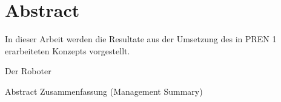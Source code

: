 \section*{Abstract}

In dieser Arbeit werden die Resultate aus der Umsetzung des in PREN 1 erarbeiteten Konzepts vorgestellt. 

Der Roboter 


Abstract
Zusammenfassung (Management Summary)
